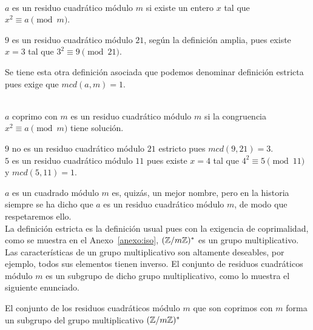 \begin{definicion} \, \\
$a$ es un residuo cuadrático módulo $m$ si existe un entero $x$ tal que $x^2 \equiv a \pmod {m}$.
\end{definicion}

\begin{ejemplo}
$9$ es un residuo cuadrático módulo $21$, según la definición amplia, pues existe $x=3$ tal que $3^2 \equiv 9 \pmod {21}$.
\end{ejemplo}

Se tiene esta otra definición asociada que podemos denominar definición estricta pues exige que $mcd(a,m)=1$.

\begin{definicion}\label{def:residuocuadr} \, \\
$a$ coprimo con $m$ es un residuo cuadrático módulo $m$ si la congruencia $x^2  \equiv a \pmod {m}$ tiene solución.
\end{definicion}

\begin{ejemplo}
$9$ no es un residuo cuadrático módulo $21$ estricto pues $mcd(9,21)=3$. \\
$5$ es un residuo cuadrático módulo $11$ pues existe $x=4$ tal que $4^2 \equiv 5 \pmod {11}$ y $mcd(5,11)=1$.
\end{ejemplo}

$a$ es un cuadrado módulo $m$ es, quizás, un mejor nombre, pero en la  historia siempre se ha dicho que $a$ es un residuo cuadrático módulo $m$, de modo que respetaremos ello. \\
 
La definición estricta es la definición usual pues con la exigencia de coprimalidad, como se muestra en el Anexo~\ref{anexo:iso}, $(\mathbb{Z}/m\mathbb{Z})^{*}$ es un grupo multiplicativo. \\
Las características de un grupo multiplicativo son altamente deseables, por ejemplo, todos sus elementos tienen inverso. El conjunto de residuos cuadráticos módulo $m$ es un subgrupo de dicho grupo multiplicativo, como lo muestra el siguiente enunciado.

\begin{enunciado} El conjunto de los residuos cuadráticos módulo $m$ que son coprimos con $m$ forma un subgrupo del grupo multiplicativo $(\mathbb{Z}/m\mathbb{Z})^{*}$
\end{enunciado}

